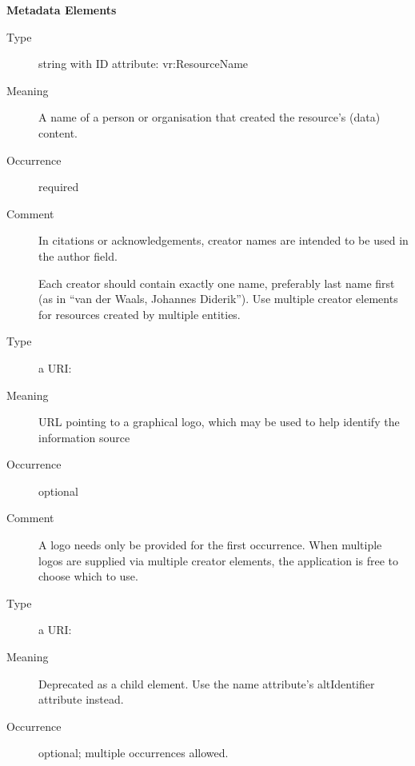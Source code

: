 \documentclass[11pt,a4paper]{ivoa}
\begin{document}
\begin{generated}
\begin{bigdescription}
\end{bigdescription}\endgroup



\vspace{0.5ex}\noindent\textbf{ Metadata Elements}

\begingroup\small\begin{bigdescription}\item[Element \xmlel{name}]
\begin{description}
\item[Type] string with ID attribute: vr:ResourceName
\item[Meaning]
                  A name of a person or organisation that created
                  the resource's (data) content.

\item[Occurrence] required
\item[Comment]
                  In citations or acknowledgements, creator names are intended
                  to be used in the author field.

                  Each creator should contain exactly one name, preferably last
                  name first (as in “van der Waals, Johannes Diderik”).  Use
                  multiple creator elements for resources created by multiple
                  entities.


\end{description}
\item[Element \xmlel{logo}]
\begin{description}
\item[Type] a URI: 
\item[Meaning]
                URL pointing to a graphical logo, which may be used to help
                identify the information source

\item[Occurrence] optional
\item[Comment]
                A logo needs only be provided for the first occurrence.
                When multiple logos are supplied via multiple creator
                elements, the application is free to choose which to
                use.


\end{description}
\item[Element \xmlel{altIdentifier}]
\begin{description}
\item[Type] a URI: 
\item[Meaning]
              	Deprecated as a child element.  Use the name
              	attribute's altIdentifier attribute instead.

\item[Occurrence] optional; multiple occurrences allowed.

\end{description}


\end{bigdescription}\endgroup

\endgroup
\end{generated}
\end{document}
